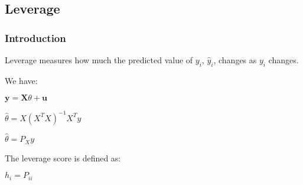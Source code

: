 
\subsection{Leverage}

\subsubsection{Introduction}

Leverage measures how much the predicted value of \(y_i\), \(\hat y_i\), changes as \(y_i\) changes.

We have:

\(\mathbf y = \mathbf X \theta +\mathbf u\)

\(\hat \theta =X(X^TX)^{-1}X^Ty\)

\(\hat \theta =P_Xy\)

The leverage score is defined as:

\(h_i=P_{ii}\)


